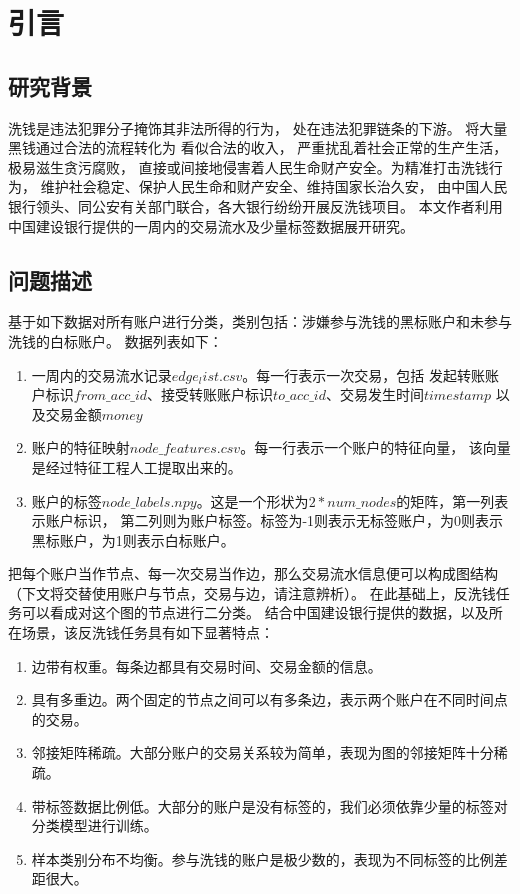 
\chapter{引言} \label{chpt:A} 
  \section{研究背景} \label{sec:A1}
  \begin{spacing}{1.5}
    洗钱是违法犯罪分子掩饰其非法所得的行为，
    处在违法犯罪链条的下游。
    将大量黑钱通过合法的流程转化为
    看似合法的收入，
    严重扰乱着社会正常的生产生活，极易滋生贪污腐败，
    直接或间接地侵害着人民生命财产安全。为精准打击洗钱行为，
    维护社会稳定、保护人民生命和财产安全、维持国家长治久安，
    由中国人民银行领头、同公安有关部门联合，各大银行纷纷开展反洗钱项目。
    本文作者利用中国建设银行提供的一周内的交易流水及少量标签数据展开研究。
  
  \end{spacing}


  \section{问题描述} \label{sec:A2}
  基于如下数据对所有账户进行分类，类别包括：涉嫌参与洗钱的黑标账户和未参与洗钱的白标账户。
  数据列表如下：
  \begin{enumerate}
    \item 一周内的交易流水记录$edge_list.csv$。每一行表示一次交易，包括
    发起转账账户标识$from\_acc\_id$、接受转账账户标识$to\_acc\_id$、交易发生时间$timestamp$
    以及交易金额$money$
    \item 账户的特征映射$node\_features.csv$。每一行表示一个账户的特征向量，
    该向量是经过特征工程人工提取出来的。
    \item 账户的标签$node\_labels.npy$。这是一个形状为$2*num\_nodes$的矩阵，第一列表示账户标识，
    第二列则为账户标签。标签为-1则表示无标签账户，为0则表示黑标账户，为1则表示白标账户。
  \end{enumerate}


  把每个账户当作节点、每一次交易当作边，那么交易流水信息便可以构成图结构（下文将交替使用账户与节点，交易与边，请注意辨析）。
  在此基础上，反洗钱任务可以看成对这个图的节点进行二分类。
  结合中国建设银行提供的数据，以及所在场景，该反洗钱任务具有如下显著特点：
  \begin{enumerate}
    \item 边带有权重。每条边都具有交易时间、交易金额的信息。
    \item 具有多重边。两个固定的节点之间可以有多条边，表示两个账户在不同时间点的交易。
    \item 邻接矩阵稀疏。大部分账户的交易关系较为简单，表现为图的邻接矩阵十分稀疏。
    \item 带标签数据比例低。大部分的账户是没有标签的，我们必须依靠少量的标签对分类模型进行训练。
    \item 样本类别分布不均衡。参与洗钱的账户是极少数的，表现为不同标签的比例差距很大。
  \end{enumerate}

